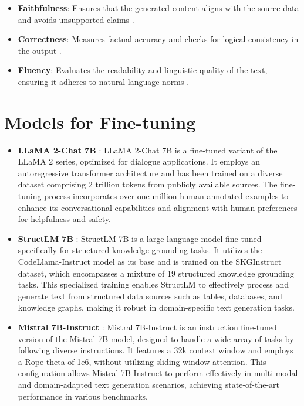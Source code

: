 \begin{itemize} 
    \item \textbf{Faithfulness}: Ensures that the generated content aligns with the source data and avoids unsupported claims \cite{madsen-etal-2022-evaluating, jacovi-goldberg-2020-towards}. 
    \item \textbf{Correctness}: Measures factual accuracy and checks for logical consistency in the output \cite{yao2023predictinggeneralizationperformancecorrectness, kim2024prometheus2opensource}. 
    \item \textbf{Fluency}: Evaluates the readability and linguistic quality of the text, ensuring it adheres to natural language norms \cite{suadaa-etal-2021-towards, Lee2023ASO}. 
\end{itemize}


\section{Models for Fine-tuning}
\label{sec:fine-tuning-models}

\begin{itemize}
    \item \textbf{LLaMA 2-Chat 7B} \cite{touvron2023llama}: LLaMA 2-Chat 7B is a fine-tuned variant of the LLaMA 2 series, optimized for dialogue applications. It employs an autoregressive transformer architecture and has been trained on a diverse dataset comprising 2 trillion tokens from publicly available sources. The fine-tuning process incorporates over one million human-annotated examples to enhance its conversational capabilities and alignment with human preferences for helpfulness and safety.

    \item \textbf{StructLM 7B} \cite{zhuang2024structlm}: StructLM 7B is a large language model fine-tuned specifically for structured knowledge grounding tasks. It utilizes the CodeLlama-Instruct model as its base and is trained on the SKGInstruct dataset, which encompasses a mixture of 19 structured knowledge grounding tasks. This specialized training enables StructLM to effectively process and generate text from structured data sources such as tables, databases, and knowledge graphs, making it robust in domain-specific text generation tasks.

    \item \textbf{Mistral 7B-Instruct} \cite{jiang2023mistral}: Mistral 7B-Instruct is an instruction fine-tuned version of the Mistral 7B model, designed to handle a wide array of tasks by following diverse instructions. It features a 32k context window and employs a Rope-theta of 1e6, without utilizing sliding-window attention. This configuration allows Mistral 7B-Instruct to perform effectively in multi-modal and domain-adapted text generation scenarios, achieving state-of-the-art performance in various benchmarks.
\end{itemize}




